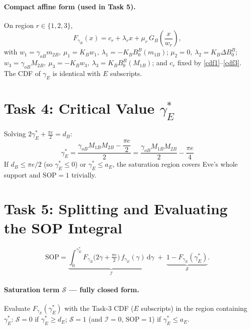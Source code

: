 \documentclass[11pt]{article}
\newcommand{\dd}{\,\mathrm{d}}
\begin{document}
\paragraph{Compact affine form (used in Task 5).} On region $r\in\{1,2,3\}$,
\begin{equation}
F_{\gamma_B}(x)=c_r+\lambda_r x+\mu_r\,G_B\!\left(\frac{x}{w_r}\right),
\label{eq:affine}
\end{equation}
with
$w_1=\gamma_{oB}m_{2B},\ \mu_1=K_B w_1,\ \lambda_1=-K_B B_0^{B}(m_{1B})$;\quad
$\mu_2=0,\ \lambda_2=K_B\Delta B_0^{B}$;\quad
$w_3=\gamma_{oB}M_{2B},\ \mu_3=-K_B w_3,\ \lambda_3=K_B B_0^{B}(M_{1B})$;
and $c_r$ fixed by \eqref{cdf1}--\eqref{cdf3}. The CDF of $\gamma_E$ is identical with $E$ subscripts.

\section{Task 4: Critical Value $\gamma_E^{*}$}
Solving $2\gamma_E^{*}+\tfrac{\pi e}{2}=d_B$:
\begin{equation}
\boxed{\;\gamma_E^{*}=\frac{\gamma_{oB}M_{1B}M_{2B}-\dfrac{\pi e}{2}}{2}
=\frac{\gamma_{oB}M_{1B}M_{2B}}{2}-\frac{\pi e}{4}\;}
\end{equation}
If $d_B\le \pi e/2$ (so $\gamma_E^{*}\le 0$) or $\gamma_E^{*}\le a_E$, the saturation region covers Eve's whole support and $\mathrm{SOP}=1$ trivially.

\section{Task 5: Splitting and Evaluating the SOP Integral}\label{sec:split}
\begin{equation}
\mathrm{SOP}
=\underbrace{\int_{0}^{\gamma_E^{*}}F_{\gamma_B}\!\big(2\gamma+\tfrac{\pi e}{2}\big)\,f_{\gamma_E}(\gamma)\dd\gamma}_{\mathcal{I}}
\;+\;\underbrace{1-F_{\gamma_E}(\gamma_E^{*})}_{\mathcal{S}}.
\end{equation}

\paragraph{Saturation term $\mathcal S$ --- fully closed form.} Evaluate $F_{\gamma_E}(\gamma_E^{*})$ with the Task-3 CDF ($E$ subscripts) in the region containing $\gamma_E^{*}$:
$\mathcal S=0$ if $\gamma_E^{*}\ge d_E$; $\mathcal S=1$ (and $\mathcal I=0$, $\mathrm{SOP}=1$) if $\gamma_E^{*}\le a_E$.
\end{document}
